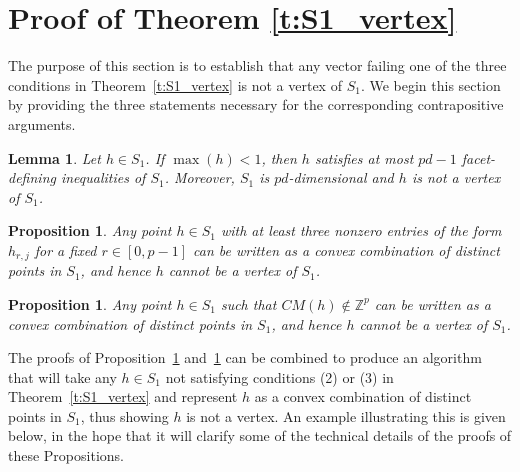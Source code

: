 \documentclass[12pt]{amsart}
\newtheorem{lemma}[thm]{Lemma}
\newtheorem{prop}[thm]{Proposition}
\theoremstyle{definition}
\numberwithin{equation}{section}
\renewcommand\>{\rangle}
\newcommand\<{\langle}
\newcommand\0{\mathbf{0}}
\newcommand\ZZ{\mathbb{Z}}
\begin{document}
\section{Proof of Theorem \ref{t:S1_vertex}}\label{sec:proofs}
\label{sec:proof}

The purpose of this section is to establish that any vector failing one of the three conditions in Theorem~\ref{t:S1_vertex} is not a vertex of $S_1$.
We begin this section by providing the three statements necessary for the corresponding contrapositive arguments.

\begin{lemma}\label{l:max}
	Let $h \in S_1$. If $\max(h) < 1$, then $h$ satisfies at most $pd-1$ facet-defining inequalities of $S_1$.
	Moreover, $S_1$ is $pd$-dimensional and $h$ is not a vertex of $S_1$.
\end{lemma}

\begin{prop}\label{p:2nonzero_decomp}
	Any point $h \in S_1$ with at least three nonzero entries of the form $h_{r,j}$ for a fixed $r \in [0,p-1]$ can be written as a convex combination of distinct points in $S_1$, and hence $h$ cannot be a vertex of $S_1$.
\end{prop}

\begin{prop}\label{p:nonintegerCM}
	Any point $h \in S_1$ such that $CM(h) \notin \ZZ^{p}$ can be written as a convex combination of distinct points in $S_1$, and hence $h$ cannot be a vertex of $S_1$.
\end{prop}

The proofs of Proposition~\ref{p:2nonzero_decomp} and~\ref{p:nonintegerCM} can be combined to produce an algorithm that will take any $h \in S_1$ not satisfying conditions (2) or (3) in Theorem~\ref{t:S1_vertex} and represent $h$ as a convex combination of distinct points in $S_1$, thus showing $h$ is not a vertex. 
An example illustrating this is given below, in the hope that it will clarify some of the technical details of the proofs of these Propositions.
\end{document}
